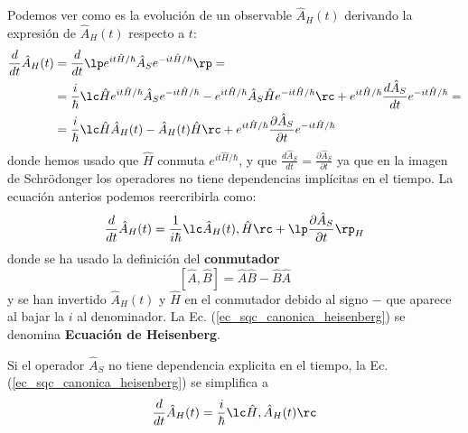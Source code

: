         Podemos ver como es la evolución de un observable $\hat{A}_H(t)$ derivando la expresión de $\hat{A}_H(t)$ respecto a $t$:
        \begin{equation}
            \begin{aligned}
                \frac{d}{dt} \hat{A}_H(t) & = \frac{d}{dt} \lp e^{it\hat{H}/\hbar} \hat{A}_S e^{-it\hat{H}/\hbar}  \rp =  \\
                & = \frac{i}{\hbar} \lc \hat{H} e^{it \hat{H}/\hbar} \hat{A}_S e^{-it \hat{H}/\hbar} - e^{it \hat{H}/\hbar} \hat{A}_S \hat{H} e^{-it \hat{H}/\hbar} \rc  + e^{it \hat{H}/\hbar} \frac{d \hat{A}_S}{d t}  e^{- it \hat{H}/\hbar} = \\
                & = \frac{i}{\hbar} \lc \hat{H} \hat{A}_H(t) - \hat{A}_H(t) \hat{H}  \rc  + e^{it \hat{H}/\hbar} \frac{\partial \hat{A}_S}{\partial t}  e^{- it \hat{H}/\hbar} 
            \end{aligned}
        \end{equation}
        donde hemos usado que $\hat{H}$ conmuta $e^{it \hat{H}/\hbar}$, y que $\frac{d \hat{A}_S}{d t} = \frac{\partial \hat{A}_S}{\partial t}$ ya que en la imagen de Schrödonger los operadores no tiene dependencias implícitas en el tiempo. La ecuación anterios podemos reercribirla como:
        \begin{equation} \label{ec_sqc_canonica_heisenberg}
            \begin{aligned}
                \frac{d}{dt} \hat{A}_H(t) & = \frac{1}{i\hbar} \lc \hat{A}_H(t), \hat{H} \rc + \lp \frac{\partial \hat{A}_S}{\partial t} \rp_H \\
            \end{aligned}
        \end{equation}
        donde se ha usado la definición del \textbf{conmutador}
        \begin{equation} \label{ec_sqc_cononica_conmutador}
            [\hat{A},\hat{B}] = \hat{A}\hat{B} - \hat{B}\hat{A}
        \end{equation}
        y se han invertido $\hat{A}_H(t)$ y $\hat{H}$ en el conmutador debido al signo $-$ que aparece al bajar la $i$ al denominador.
        La Ec. (\ref{ec_sqc_canonica_heisenberg}) se denomina \textbf{Ecuación de Heisenberg}.

        Si el operador $\hat{A}_S$ no tiene dependencia explicita en el tiempo, la Ec. (\ref{ec_sqc_canonica_heisenberg}) se simplifica a
        \begin{equation}
             \frac{d}{dt} \hat{A}_H(t) = \frac{i}{\hbar} \lc \hat{H}, \hat{A}_H(t) \rc
        \end{equation}
        
